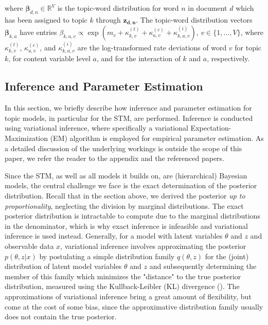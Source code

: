 where $\boldsymbol{\beta}_{d, n} \in \mathbb{R}^V$ is the topic-word distribution for word $n$ in document $d$ which has been assigned to topic $k$ through $\boldsymbol{z_{d,n}}$. The topic-word distribution vectors $\boldsymbol{\beta}_{k,a}$ have entries $\beta_{k,a,v} \propto \exp(m_{v} + \kappa_{k,v}^{(t)} + \kappa_{a,v}^{(c)} + \kappa_{k, a,v}^{(i)})$, $v \in \{1,\dots,V\}$, where $\kappa_{k,v}^{(t)}$, $\kappa_{a,v}^{(c)}$, and $\kappa_{k, a,v}^{(i)}$ are the log-transformed rate deviations of word $v$ for topic $k$, for content variable level $a$, and for the interaction of $k$ and $a$, respectively.

\subsection{Inference and Parameter Estimation}
\label{Inference and Parameter Estimation}

In this section, we briefly describe how inference and parameter estimation for topic models, in particular for the STM, are performed. Inference is conducted using variational inference, where specifically a variational Expectation-Maximization (EM) algorithm is employed for empirical parameter estimation. As a detailed discussion of the underlying workings is outside the scope of this paper, we refer the reader to the appendix and the referenced papers.

Since the STM, as well as all models it builds on, are (hierarchical) Bayesian models, the central challenge we face is the exact determination of the posterior distribution. Recall that in the section above, we derived the posterior \textit{up to proportionality}, neglecting the division by marginal distributions. The exact posterior distribution is intractable to compute due to the marginal distributions in the denominator, which is why exact inference is infeasible and variational inference is used instead. Generally, for a model with latent variables $\theta$ and $z$ and observable data $x$, variational inference involves approximating the posterior $p(\theta,z|x)$ by postulating a simple distribution family $q(\theta,z)$ for the (joint) distribution of latent model variables $\theta$ and $z$ and subsequently determining the member of this family which minimizes the "distance" to the true posterior distribution, measured using the Kullback-Leibler (KL) divergence (\citealp{wang2013variational}). The approximations of variational inference bring a great amount of flexibility, but come at the cost of some bias, since the approximative distribution family usually does not contain the true posterior.

